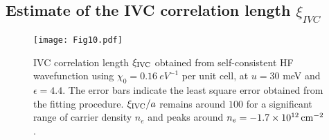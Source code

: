 \documentclass[aps,pra,twocolumn,superscriptaddress,10pt,article,nofootinbib,showpacs,longbibliography]{revtex4-1}
\begin{document}
\subsection{Estimate of the IVC correlation length $\xi_{IVC}$} 
\label{sec:xi}

\begin{figure}[htbp]
    \centering
    \texttt{[image: Fig10.pdf]}
    \caption{IVC correlation length $\xi_{\rm IVC}$ obtained from self-consistent HF wavefunction using $\chi_0 = \SI{0.16}{eV^{-1}}$ per unit cell, at $u = 30$ meV and $\epsilon = 4.4$. The error bars indicate the least square error obtained from the fitting procedure. $\xi_{\rm IVC}/a$ remains around $100$ for a significant range of carrier density $n_e$ and peaks around $n_e = \SI{-1.7E12}{\cm^{-2}}$.}
    \label{fig:Xi}
\end{figure}
\end{document}
